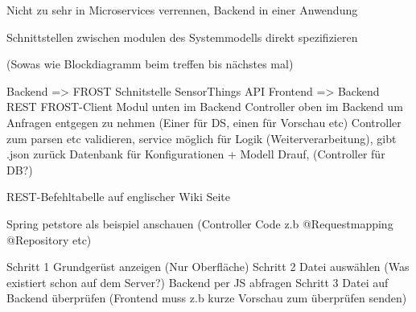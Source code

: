 Nicht zu sehr in Microservices verrennen, Backend in einer Anwendung

Schnittstellen zwischen modulen des Systemmodells direkt spezifizieren

(Sowas wie Blockdiagramm beim treffen bis nächstes mal)

Backend => FROST Schnitstelle SensorThings API
Frontend => Backend REST
FROST-Client Modul unten im Backend
Controller oben im Backend um Anfragen entgegen zu nehmen
(Einer für DS, einen für Vorschau etc)
Controller zum parsen etc validieren, service möglich für Logik (Weiterverarbeitung), gibt .json zurück
Datenbank für Konfigurationen + Modell Drauf, (Controller für DB?)

REST-Befehltabelle auf englischer Wiki Seite

Spring petstore als beispiel anschauen
(Controller Code z.b @Requestmapping @Repository etc)

Schritt 1 Grundgerüst anzeigen (Nur Oberfläche)
Schritt 2 Datei auswählen (Was existiert schon auf dem Server?)
Backend per JS abfragen
Schritt 3 Datei auf Backend überprüfen (Frontend muss z.b kurze Vorschau zum überprüfen senden)
